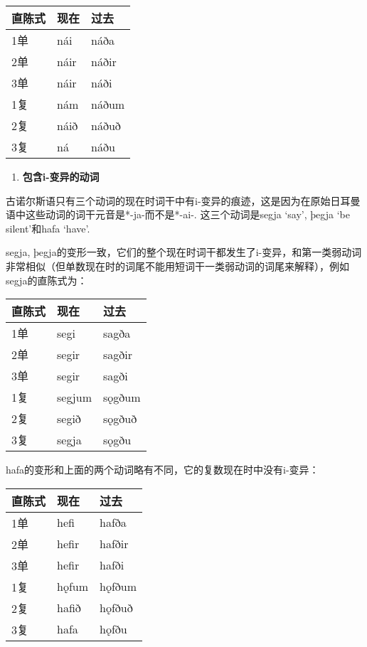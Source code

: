 \begin{longtable}{lll}
\toprule
直陈式 & 现在 & 过去 \\
\midrule
\endhead
\bottomrule
\endfoot
1单 & nái & náða \\
2单 & náir & náðir \\
3单 & náir & náði \\
1复 & nám & náðum \\
2复 & náið & náðuð \\
3复 & ná & náðu \\
\end{longtable}

\begin{enumerate}
\def\labelenumi{\arabic{enumi})}
\setcounter{enumi}{1}
\item
  \textbf{包含i-变异的动词}
\end{enumerate}

古诺尔斯语只有三个动词的现在时词干中有i-变异的痕迹，这是因为在原始日耳曼语中这些动词的词干元音是*-ja-而不是*-ai-.
这三个动词是segja `say', þegja `be silent'和hafa `have'.

segja,
þegja的变形一致，它们的整个现在时词干都发生了i-变异，和第一类弱动词非常相似（但单数现在时的词尾不能用短词干一类弱动词的词尾来解释），例如segja的直陈式为：

\begin{longtable}{lll}
\toprule
直陈式 & 现在 & 过去 \\
\midrule
\endhead
\bottomrule
\endfoot
1单 & segi & sagða \\
2单 & segir & sagðir \\
3单 & segir & sagði \\
1复 & segjum & sǫgðum \\
2复 & segið & sǫgðuð \\
3复 & segja & sǫgðu \\
\end{longtable}

hafa的变形和上面的两个动词略有不同，它的复数现在时中没有i-变异：

\begin{longtable}{lll}
\toprule
直陈式 & 现在 & 过去 \\
\midrule
\endhead
\bottomrule
\endfoot
1单 & hefi & hafða \\
2单 & hefir & hafðir \\
3单 & hefir & hafði \\
1复 & hǫfum & hǫfðum \\
2复 & hafið & hǫfðuð \\
3复 & hafa & hǫfðu \\
\end{longtable}


